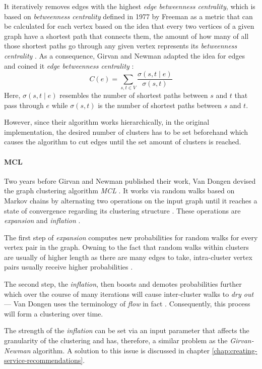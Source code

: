 \documentclass[12pt,a4paper]{report}
\begin{document}
It iteratively removes edges with the highest \textit{edge betweenness
centrality}, which is based on \textit{betweenness centrality} defined in 1977
by Freeman as a metric that can be calculated for each vertex based on the idea
that every two vertices of a given graph have a shortest path that connects
them, the amount of how many of all those shortest paths go through any given
vertex represents its \textit{betweenness centrality} \cite{freeman1977set}. As
a consequence, Girvan and Newman adapted the idea for edges and coined it
\textit{edge betweenness centrality} \cite{girvan2002community}:
\[
  C(e) = \sum_{s, t \in V} \frac{\sigma(s, t \mid e)}{\sigma(s, t)}
\]
Here, \(\sigma(s, t \mid e)\) resembles the number of shortest paths between
\(s\) and \(t\) that pass through \(e\) while \(\sigma(s, t)\) is the
number of shortest paths between \(s\) and \(t\).

However, since their algorithm works hierarchically, in the original
implementation, the desired number of clusters has to be set beforehand which
causes the algorithm to cut edges until the set amount of clusters is reached.

\paragraph{MCL \cite{vandongen2000graph}}
Two years before Girvan and Newman
published their work, Van Dongen devised the graph clustering algorithm \textit{
MCL} \cite{vandongen2000graph}. It works via random walks based on Markov
chains by alternating two operations on the input graph until it reaches a
state of convergence regarding its clustering structure \cite{
vandongen2000graph}. These operations are \textit{expansion} and
\textit{inflation} \cite{vandongen2000graph}.

The first step of \textit{expansion} computes new probabilities for random
walks for every vertex pair in the graph. Owning to the fact that random walks
within clusters are usually of higher length as there are many edges to take,
intra-cluster vertex pairs usually receive higher probabilities
\cite{vandongen2000graph}.

The second step, the \textit{inflation}, then boosts and demotes probabilities
further which over the course of many iterations will cause inter-cluster walks
to \textit{dry out} --- Van Dongen uses the terminology of \textit{flow} in
fact \cite{vandongen2000graph}. Consequently, this process will form a
clustering over time.

The strength of the \textit{inflation} can be set via an input parameter that
affects the granularity of the clustering and has, therefore, a similar problem
as the \textit{Girvan-Newman} algorithm. A solution to this issue is discussed
in chapter \ref{chap:creating-service-recommendations}.
\end{document}
